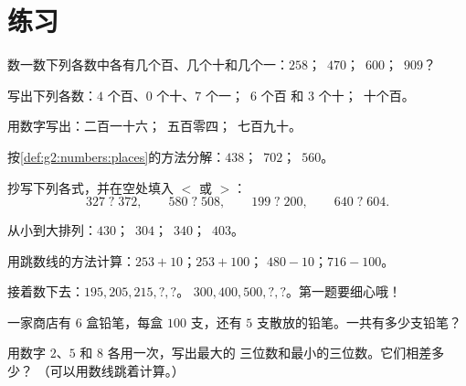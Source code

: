 \section{练习}

\begin{exercise}[$\star$]\label{exo:g2:numbers:1}
数一数下列各数中各有几个百、几个十和几个一：$258$；\ $470$；\ $600$；\
$909$？
\end{exercise}

\begin{exercise}[$\star$]\label{exo:g2:numbers:2}
写出下列各数：$4$ 个百、$0$ 个十、$7$ 个一；\ $6$ 个百
和 $3$ 个十；\ 十个百。
\end{exercise}

\begin{exercise}[$\star$]\label{exo:g2:numbers:3}
用数字写出：二百一十六；\ 五百零四；\
七百九十。
\end{exercise}

\begin{exercise}[$\star$]\label{exo:g2:numbers:4}
按\cref{def:g2:numbers:places}的方法分解：$438$；\ $702$；\
$560$。
\end{exercise}

\begin{exercise}[$\star$]\label{exo:g2:numbers:5}
抄写下列各式，并在空处填入 $<$ 或 $>$：
\[
327 \;?\; 372, \qquad
580 \;?\; 508, \qquad
199 \;?\; 200, \qquad
640 \;?\; 604 .
\]
\end{exercise}

\begin{exercise}[$\star$]\label{exo:g2:numbers:6}
从小到大排列：$430$；\ $304$；\ $340$；\ $403$。
\end{exercise}

\begin{exercise}[$\star$]\label{exo:g2:numbers:7}
用跳数线的方法计算：$253 + 10$；\quad $253 + 100$；
\quad $480 - 10$；\quad $716 - 100$。
\end{exercise}

\begin{exercise}[$\star$]\label{exo:g2:numbers:8}
接着数下去：$195, 205, 215, ?, ?$。\quad
$300, 400, 500, ?, ?$。\quad 第一题要细心哦！
\end{exercise}

\begin{exercise}[$\star$]\label{exo:g2:numbers:9}
一家商店有 $6$ 盒铅笔，每盒 $100$ 支，还有
$5$ 支散放的铅笔。一共有多少支铅笔？
\end{exercise}

\begin{exercise}[$\star\star$]\label{exo:g2:numbers:10}
用数字 $2$、$5$ 和 $8$ 各用一次，写出最大的
三位数和最小的三位数。它们相差多少？
（可以用数线跳着计算。）
\end{exercise}

